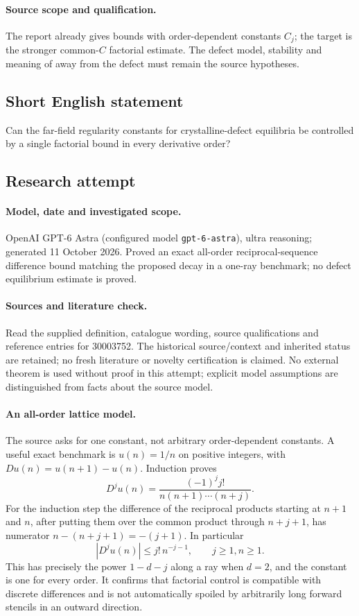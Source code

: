\documentclass[11pt]{article}
\begin{document}
\paragraph{Source scope and qualification.}
The report already gives bounds with order-dependent constants $C_j$; the target is the stronger common-$C$ factorial estimate. The defect model, stability and meaning of away from the defect must remain the source hypotheses.
\subsection{Short English statement}
Can the far-field regularity constants for crystalline-defect equilibria be controlled by a single factorial bound in every derivative order?
\subsection{Research attempt}
\paragraph{Model, date and investigated scope.}
OpenAI GPT-6 Astra (configured model \texttt{gpt-6-astra}), ultra reasoning; generated 11 October 2026. Proved an exact all-order reciprocal-sequence difference bound matching the proposed decay in a one-ray benchmark; no defect equilibrium estimate is proved.

\paragraph{Sources and literature check.}
Read the supplied definition, catalogue wording, source qualifications and reference entries for 30003752. The historical source/context and inherited status are retained; no fresh literature or novelty certification is claimed. No external theorem is used without proof in this attempt; explicit model assumptions are distinguished from facts about the source model.

\paragraph{An all-order lattice model.} The source asks for one constant, not arbitrary order-dependent constants. A useful exact benchmark is \(u(n)=1/n\) on positive integers, with \(Du(n)=u(n+1)-u(n)\). Induction proves
\[
 D^ju(n)=\frac{(-1)^jj!}{n(n+1)\cdots(n+j)}.
\]
For the induction step the difference of the reciprocal products starting at \(n+1\) and \(n\), after putting them over the common product through \(n+j+1\), has numerator \(n-(n+j+1)=-(j+1)\). In particular
\[
 |D^ju(n)|\le j!\,n^{-j-1},\qquad j\ge1,n\ge1.
\]
This has precisely the power \(1-d-j\) along a ray when \(d=2\), and the constant is one for every order. It confirms that factorial control is compatible with discrete differences and is not automatically spoiled by arbitrarily long forward stencils in an outward direction.
\end{document}
